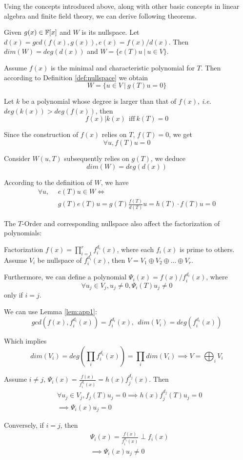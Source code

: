 Using the concepts introduced above, along with other basic concepts in linear algebra and finite field theory,
we can derive following theorems.

\begin{Lemma}
\label{lem:app1}
Given $g(x) \in {\mathbb{F}}[x]$ and $W$ is its nullspace. Let $d(x) = gcd(f(x),g(x)), e(x) = f(x)/d(x)$. 
Then $dim(W) = deg(d(x))$ and $W = \{e(T)u~|~u \in V\}$.
\end{Lemma}
\begin{Proof}
Assume $f(x)$ is the minimal and characteristic polynomial for $T$. Then according to Definition \ref{def:nullspace}
we obtain 
$$W = \{u\in V~|~g(T)u = 0\}$$

Let $k$ be a polynomial whose degree is larger than that of $f(x)$, {\it i.e.} $deg(k(x))>deg(f(x))$, then
$$f(x)|k(x)~~\text{iff}~k(T)=0$$

Since the construction of $f(x)$ relies on $T$, $f(T) = 0$, we get
$$\forall u, f(T)u = 0$$

Consider $W(u,T)$ subsequently relies on $g(T)$, we deduce 
$$dim(W) = deg(d(x))$$

According to the definition of $W$, we have
\begin{align*}
\forall u,~~& e(T)u \in W \Longleftrightarrow \\
& g(T)e(T)u = g(T)\frac{f(T)}{d(T)} u = h(T)\cdot f(T) u = 0
\end{align*}
\end{Proof}

The $T$-Order and corresponding nullspace also affect the factorization of polynomials:
\begin{Lemma}[Factorization of $f(x)$]
Factorization $f(x) = \prod_{i=1}^{r} f_{i}^{d_i} (x)$, where each $f_i(x)$ is prime to others. 
Assume $V_i$ be nullspace of $f_{i}^{d_i} (x)$, then $V = V_1\oplus V_2 \oplus \dots\oplus V_r$.

Furthermore, we can define a polynomial $\Psi_i(x) = f(x)/f_{i}^{d_i} (x)$, where 
$$\forall u_j \in V_j, u_j \neq 0, \Psi_i(T)u_j \neq 0$$
only if $i = j$.
\end{Lemma}
\begin{Proof}
We can use Lemma \ref{lem:app1}:
$$gcd(f(x),f_{i}^{d_i} (x)) = f_{i}^{d_i} (x),~~dim(V_i) = deg(f_{i}^{d_i} (x))$$

Which implies 
$$dim(V_i) = deg\left(\prod_i f_{i}^{d_i} (x)\right) = \prod_i dim(V_i) \implies V = \bigoplus_i V_i$$

Assume $i\neq j$, $\Psi_i(x) = \frac{f(x)}{f_{i}^{d_i} (x)} = h(x)f_{j}^{d_j} (x)$. Then
\begin{align*}
&\forall u_j\in V_j, f_j(T)u_j = 0 \implies h(x)f_{j}^{d_j} (T)u_j = 0 \\
& \implies \Psi_i(x)u_j = 0
\end{align*}

Conversely, if $i=j$, then
\begin{align*}
& \Psi_i(x) = \frac{f(x)}{f_{i}^{d_i} (x)} \perp f_i(x) \\
& \implies \Psi_i(x)u_j \neq 0
\end{align*}
\end{Proof}

